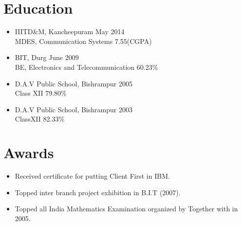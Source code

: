 \documentclass[letterpaper, 12pt]{article}
\begin{document}
		\begin{minipage}{0.5\textwidth}
		
			\section{Education}
				\begin{itemize}[noitemsep]
					\item {{IIITD\&M, Kancheepuram} \hfill {May 2014}\\{MDES, Communication Systems} \hfill {7.55(CGPA)}} 
					\item {BIT, Durg} \hfill {June 2009}\\{BE, Electronics and Telecommunication} \hfill {60.23\%}
					\item  {{D.A.V Public School, Bishrampur} \hfill {2005}\\{Class XII} \hfill {79.80\%}}
					\item {{D.A.V Public School, Bishrampur} \hfill {2003}\\ {ClassXII} \hfill {82.33\%}}
				\end{itemize}		
		\end{minipage}\hfil
	\begin{minipage}{0.45\textwidth}
		\section{Awards}
		\begin{itemize}[noitemsep]
			\item {Received certificate for putting Client First in IBM.}
			\item {Topped inter branch project exhibition in B.I.T (2007).}
			\item {Topped all India Mathematics Examination organized by Together with in 2005.}
		\end{itemize}
		
	\end{minipage}	
		
		
		
		
		
		
		
					
\end{document}
